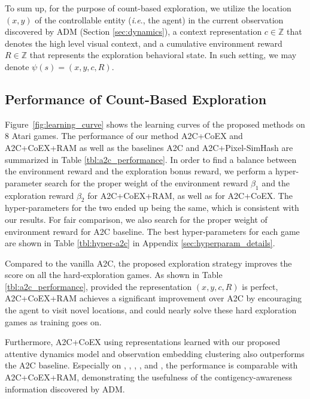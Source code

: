 \documentclass{article} \usepackage{iclr,times}
\makeatletter
\newcommand{\coex}{{CoEX}}
\newcommand{\coexRAM}{{CoEX+RAM}}
\newcommand{\ADM}{{ADM}}
\DeclareRobustCommand\onedot{\futurelet\@let@token\@onedot}
\def\onedot{.}
\def\ie{\emph{i.e}\onedot} \def\Ie{\emph{I.e}\onedot}
\makeatother
\begin{document}
{To sum up, for the purpose of count-based exploration,
we utilize
the location
$(x, y)$ of the controllable entity (\ie, the agent) in the current observation discovered by ADM (Section \ref{sec:dynamics}),
a context representation $c \in \mathbb{Z}$ that denotes the high level visual context,
and a cumulative environment reward $R \in \mathbb{Z}$ that represents the exploration behavioral state.
In such setting, we may denote $\psi(s) = (x, y, c, R)$.









\vspace*{-3pt}
\subsection{Performance of Count-Based Exploration}
\vspace*{-5pt}



Figure~\ref{fig:learning_curve}
shows the learning curves of the proposed methods on 8 Atari games.
The performance of our method A2C+\coex{} and A2C+\coexRAM{} as well as
the baselines A2C and A2C+Pixel-SimHash are summarized in Table \ref{tbl:a2c_performance}.
In order to find a balance between the environment reward and the exploration bonus reward,
we perform a hyper-parameter search for the proper weight of
the environment reward $\beta_1$ and the exploration reward $\beta_2$ for A2C+\coexRAM{}, as well as for A2C+\coex.
The hyper-parameters for the two ended up being the same, which is consistent with our results.
For fair comparison, we also search for the proper weight of environment reward for A2C baseline.
The best hyper-parameters for each game are shown in Table \ref{tbl:hyper-a2c} in Appendix \ref{sec:hyperparam_details}.






Compared to the vanilla A2C,
the proposed exploration strategy improves the score on all the hard-exploration games.
As shown in Table \ref{tbl:a2c_performance},
provided the representation $(x,y,c,R)$ is perfect, A2C+\coexRAM{} achieves a significant improvement over A2C
by encouraging the agent to visit novel locations, and could nearly solve these hard exploration games as training goes on.

Furthermore, A2C+\coex{} using representations learned with our proposed attentive dynamics model and observation embedding clustering
also outperforms the A2C baseline. Especially on \Freeway, \Frostbite, \Hero, \MontezumaRevenge, \Qbert and \Seaquest, the performance is comparable with A2C+\coexRAM{},
demonstrating the usefulness of the contigency-awareness information discovered by \ADM{}.






}
\end{document}
